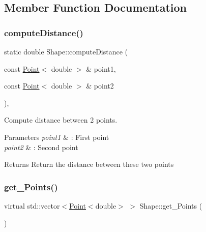 \subsection{Member Function Documentation}
\mbox{\label{classShape_aadd5fcb0535a62f4ed4dcfb39e86336a}} 
\subsubsection{\texorpdfstring{compute\+Distance()}{computeDistance()}}
{\footnotesize\ttfamily static double Shape\+::compute\+Distance (\begin{DoxyParamCaption}\item[{const \hyperlink{classPoint}{Point}$<$ double $>$ \&}]{point1,  }\item[{const \hyperlink{classPoint}{Point}$<$ double $>$ \&}]{point2 }\end{DoxyParamCaption})\hspace{0.3cm}{\ttfamily [inline]}, {\ttfamily [static]}}



Compute distance between 2 points. 


\begin{DoxyParams}{Parameters}
{\em point1} & \+: First point \\
\hline
{\em point2} & \+: Second point \\
\hline
\end{DoxyParams}
\begin{DoxyReturn}{Returns}
Return the distance between these two points 
\end{DoxyReturn}
\mbox{\label{classShape_add74a5c682840fa4a519242b1ddbd0b5}} 
\subsubsection{\texorpdfstring{get\+\_\+\+Points()}{get\_Points()}}
{\footnotesize\ttfamily virtual std\+::vector$<$\hyperlink{classPoint}{Point}$<$double$>$ $>$ Shape\+::get\+\_\+\+Points (\begin{DoxyParamCaption}{ }\end{DoxyParamCaption})\hspace{0.3cm}{\ttfamily [pure virtual]}}



